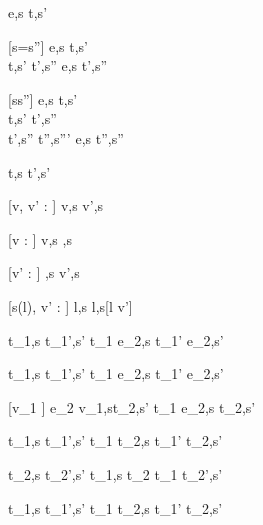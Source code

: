 






  {e,s \normalise t,s'}


[s=s'']
    {e,s \evaluate t,s' \\
     t,s' \stride t',s''}
    {e,s \normalise t',s''}


[s\neq s'']
    {e,s \evaluate t,s' \\
     t,s' \stride t',s'' \\
     t',s'' \normalise t'',s'''}
    {e,s \normalise t'',s''}





  {t,s  t',s'}

[v, v' : \tau]
  { }
  {\Edit v,s  \Edit v',s}

[v : \tau]
  { }
  {\Edit v,s \handle{\Empty} \Enter \tau,s}

[v' : \tau]
  { }
  {\Enter \tau,s  \Edit v',s}

[s(l), v' : \tau]
  { }
  {\Update l,s  \Update l,s[l \mapsto v']{}}


  {t_1,s  t_1',s'}
  {t_1 \Then e_2,s  t_1' \Then e_2,s'}

  {t_1,s  t_1',s'}
  {t_1 \Next e_2,s  t_1' \Next e_2,s'}

[\equiv v_1 \wedge \neg{}]
  {e_2 v_1,s\stride t_2,s'}
  {t_1 \Next e_2,s \handle{\Continue} t_2,s'}


  {t_1,s  t_1',s' }
  {t_1 \And t_2,s  t_1' \And t_2,s'}

  {t_2,s  t_2',s'}
  {t_1,s \And t_2  t_1 \And t_2',s'}


  {t_1,s  t_1',s'}
  {t_1 \Or t_2,s  t_1' \Or t_2,s'}

